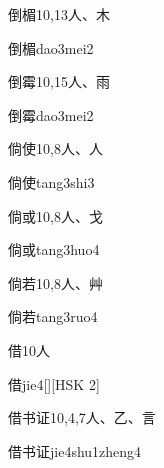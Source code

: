 \begin{entry}{倒楣}{10,13}{⼈、⽊}
  \begin{phonetics}{倒楣}{dao3mei2}
  \end{phonetics}
\end{entry}

\begin{entry}{倒霉}{10,15}{⼈、⾬}
  \begin{phonetics}{倒霉}{dao3mei2}
  \end{phonetics}
\end{entry}

\begin{entry}{倘使}{10,8}{⼈、⼈}
  \begin{phonetics}{倘使}{tang3shi3}
  \end{phonetics}
\end{entry}

\begin{entry}{倘或}{10,8}{⼈、⼽}
  \begin{phonetics}{倘或}{tang3huo4}
  \end{phonetics}
\end{entry}

\begin{entry}{倘若}{10,8}{⼈、⾋}
  \begin{phonetics}{倘若}{tang3ruo4}
  \end{phonetics}
\end{entry}

\begin{entry}{借}{10}{⼈}
  \begin{phonetics}{借}{jie4}[][HSK 2]
  \end{phonetics}
\end{entry}

\begin{entry}{借书证}{10,4,7}{⼈、⼄、⾔}
  \begin{phonetics}{借书证}{jie4shu1zheng4}
  \end{phonetics}
\end{entry}

